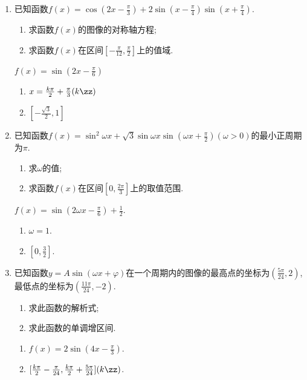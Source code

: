 \begin{enumerate}
\item 已知函数$f(x)=\cos(2x-\frac{\pi}{3})+2\sin(x-\frac{\pi}{4})\sin(x+\frac{\pi}{4})$. 
\begin{enumerate}[(1)]
\item 求函数$f(x)$的图像的对称轴方程; 
\item 求函数$f(x)$在区间$[-\frac{\pi}{12},\frac{\pi}{2}]$上的值域. 
\end{enumerate}
\begin{jieda}
$f(x)=\sin(2x-\frac{\pi}{6})$
\begin{enumerate}[(1)]
\item $x=\frac{k\pi}{2}+\frac{\pi}{3}(k\zz)$
\item $[-\frac{\sqrt{3}}{2},1]$
\end{enumerate}
\end{jieda}

\item 已知函数$f(x)=\sin^2\omega{x}+\sqrt{3}\sin\omega{x}\sin(\omega{x}+\frac{\pi}{2})(\omega>0)$的最小正周期为$\pi$. 
\begin{enumerate}[(1)]
\item 求$\omega$的值; 
\item 求函数$f(x)$在区间$[0,\frac{2\pi}{3}]$上的取值范围. 
\end{enumerate}
\begin{jieda}
$f(x)=\sin(2\omega{x}-\frac{\pi}{6})+\frac{1}{2}$. 
\begin{enumerate}[(1)]
\item $\omega=1$. 
\item $[0,\frac{3}{2}]$. 
\end{enumerate}
\end{jieda}

\item 已知函数$y=A\sin(\omega{x}+\varphi)$在一个周期内的图像的最高点的坐标为$(\frac{5\pi}{24},2)$, 最低点的坐标为$(\tfrac{11\pi}{24},-2)$. 
\begin{enumerate}[(1)]
\item 求此函数的解析式;
\item 求此函数的单调增区间.
\end{enumerate}
\begin{jieda}
\begin{enumerate}[(1)]
\item $f(x)=2\sin(4x-\frac{\pi}{3})$. 
\item $[\frac{k\pi}{2}-\frac{\pi}{24},\frac{k\pi}{2}+\frac{5\pi}{24}](k\zz)$. 
\end{enumerate}
\end{jieda}



\end{enumerate}
